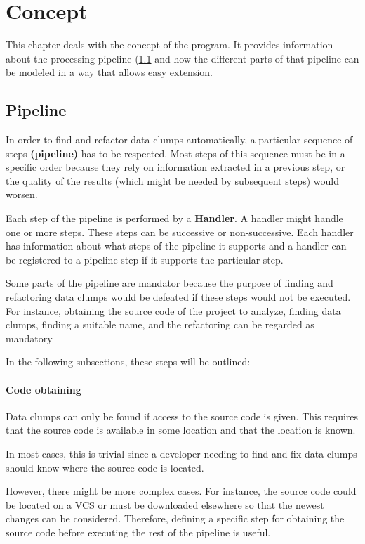 \begingroup
\renewcommand{\cleardoublepage}{} %
\renewcommand{\clearpage}{}
\chapter{Concept}\label{chapter_conception}
\endgroup
This chapter deals with the concept of the program. It provides information about the processing pipeline (\ref{sec:pipeline} and how the different parts of that pipeline can be modeled in a way that allows easy extension. 


\hfill
\section{Pipeline}\label{sec:pipeline}
In order to find and refactor data clumps automatically, a particular sequence of steps \textbf{(pipeline)} has to be respected. Most steps of this sequence must be in a specific order because they rely on information extracted in a previous step, or the quality of the results (which might be needed by subsequent steps) would worsen.

Each step of the pipeline is performed by a  \textbf{Handler}. A handler might handle one or more steps. These steps can be successive or non-successive. Each handler has information about what steps of the pipeline it supports and  a handler can be registered to a pipeline step if it supports the particular step. 

Some parts of the pipeline are mandator because the purpose of finding and refactoring data clumps would be defeated if these steps would not be executed. For instance, obtaining the source code of the project to analyze, finding data clumps, finding a suitable name, and the refactoring can be regarded as mandatory

In the following subsections, these steps will be outlined:
\subsubsection{Code obtaining}
Data clumps can only be found if access to the source code is given. This requires that the source code is available in some location and that the location is known.

In most cases, this is trivial since a developer needing to find and fix data clumps should know where the source code is located.

However, there might be more complex cases. For instance, the source code could be located on a \ac{VCS} or must be downloaded elsewhere so that the newest changes can be considered. Therefore, defining a specific step for obtaining the source code before executing the rest of the pipeline is useful. 

